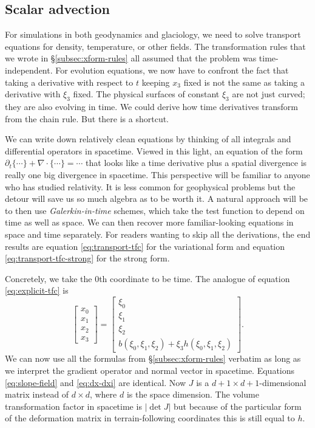 \documentclass[gmd, manuscript]{copernicus}
\begin{document}
\subsection{Scalar advection}

For simulations in both geodynamics and glaciology, we need to solve transport equations for density, temperature, or other fields.
The transformation rules that we wrote in \S\ref{subsec:xform-rules} all assumed that the problem was time-independent.
For evolution equations, we now have to confront the fact that taking a derivative with respect to $t$ keeping $x_3$ fixed is not the same as taking a derivative with $\xi_3$ fixed.
The physical surfaces of constant $\xi_3$ are not just curved; they are also evolving in time.
We could derive how time derivatives transform from the chain rule.
But there is a shortcut.

We can write down relatively clean equations by thinking of all integrals and differential operators in spacetime.
Viewed in this light, an equation of the form $\partial_t\{\cdots\} + \nabla\cdot\{\cdots\} = \cdots$ that looks like a time derivative plus a spatial divergence is really one big divergence in spacetime.
This perspective will be familiar to anyone who has studied relativity.
It is less common for geophysical problems but the detour will save us so much algebra as to be worth it.
A natural approach will be to then use \emph{Galerkin-in-time} schemes, which take the test function to depend on time as well as space.
We can then recover more familiar-looking equations in space and time separately.
For readers wanting to skip all the derivations, the end results are equation \eqref{eq:transport-tfc} for the variational form and equation \eqref{eq:transport-tfc-strong} for the strong form.

Concretely, we take the 0th coordinate to be time.
The analogue of equation \eqref{eq:explicit-tfc} is
\begin{equation}
    \left[\begin{matrix}x_0 \\ x_1 \\ x_2 \\ x_3\end{matrix}\right] = \left[\begin{matrix}\xi_0 \\ \xi_1 \\ \xi_2 \\ b(\xi_0, \xi_1, \xi_2) + \xi_3h(\xi_0, \xi_1, \xi_2)\end{matrix}\right].
    \label{eq:explicit-tfct}
\end{equation}
We can now use all the formulas from \S\ref{subsec:xform-rules} verbatim as long as we interpret the gradient operator and normal vector in spacetime.
Equations \eqref{eq:slope-field} and \eqref{eq:dx-dxi} are identical.
Now $J$ is a $d + 1 \times d + 1$-dimensional matrix instead of $d \times d$, where $d$ is the space dimension.
The volume transformation factor in spacetime is $|\det J|$ but because of the particular form of the deformation matrix in terrain-following coordinates this is still equal to $h$.
\end{document}
